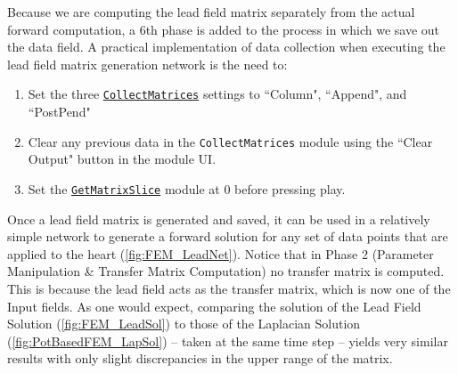 Because we are computing the lead field matrix separately from the actual forward computation, a 6th phase is added to the process in which we save out the data field.
A practical implementation of data collection when executing the lead field matrix generation network is the need to:
\begin{enumerate}
\itemsep-.25em
\item Set the three \href{http://sciinstitute.github.io/scirun.pages/modules.html#CollectMatrices}{\tt CollectMatrices} settings to ``Column", ``Append", and ``PostPend"
\item Clear any previous data in the {\tt CollectMatrices} module using the ``Clear Output" button in the module UI.
\item Set the \href{http://sciinstitute.github.io/scirun.pages/modules.html#GetMatrixSlice}{\tt GetMatrixSlice} module at 0 before pressing play.
\end{enumerate}

Once a lead field matrix is generated and saved, it can be used in a relatively simple network to generate a forward solution for any set of data points that are applied to the heart (\autoref{fig:FEM_LeadNet}).
Notice that in Phase 2 (Parameter Manipulation \& Transfer Matrix Computation) no transfer matrix is computed.
This is because the lead field acts as the transfer matrix, which is now one of the Input fields.
As one would expect, comparing the solution of the Lead Field Solution (\autoref{fig:FEM_LeadSol}) to those of the Laplacian Solution (\autoref{fig:PotBasedFEM_LapSol}) -- taken at the same time step -- yields very similar results with only slight discrepancies in the upper range of the matrix.



\newpage

